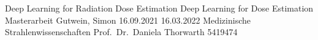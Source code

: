\documentclass[12pt, oneside]{article}
\begin{document}
\renewcommand{\tableautorefname}{tab.}
\renewcommand{\figureautorefname}{fig.}
\renewcommand{\equationautorefname}{eq.}

\titlespacing{\section}{0pt}{6pt}{12pt}
\titlespacing{\subsection}{0pt}{6pt}{6pt}
\titlespacing{\subsubsection}{0pt}{6pt}{6pt}

\Titlepage
    {Deep Learning for Radiation Dose Estimation}   %
    {Deep Learning for Dose Estimation}             %
    {Masterarbeit}                                  %
    {Gutwein, Simon}                                %
    {16.09.2021}                                    %
    {16.03.2022}                                    %
    {Medizinische Strahlenwissenschaften}           %
    {Prof.~Dr.~Daniela Thorwarth}                   %
    {5419474}                                       %


\newpage
{}

\Abstract

\tableofcontents


\newpage

\listoffigures
{}%



\newpage
\end{document}
